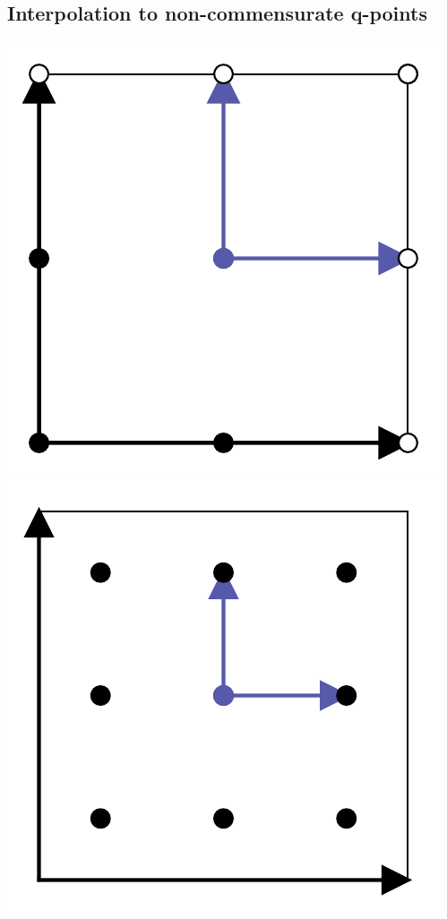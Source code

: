 \subsection{Interpolation to non-commensurate q-points}
\begin{marginfigure}[0cm]
	\centering
	\includegraphics[width=.8\textwidth]{./data/sketches/2_sc.pdf}
	\hfill
	\includegraphics[width=.8\textwidth]{./data/sketches/3_sc.pdf}
	\hfill

\end{marginfigure}
